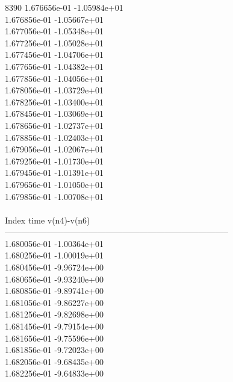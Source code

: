 8390	1.676656e-01	-1.05984e+01	\\ 	1.676856e-01	-1.05667e+01	\\ 	1.677056e-01	-1.05348e+01	\\ 	1.677256e-01	-1.05028e+01	\\ 	1.677456e-01	-1.04706e+01	\\ 	1.677656e-01	-1.04382e+01	\\ 	1.677856e-01	-1.04056e+01	\\ 	1.678056e-01	-1.03729e+01	\\ 	1.678256e-01	-1.03400e+01	\\ 	1.678456e-01	-1.03069e+01	\\ 	1.678656e-01	-1.02737e+01	\\ 	1.678856e-01	-1.02403e+01	\\ 	1.679056e-01	-1.02067e+01	\\ 	1.679256e-01	-1.01730e+01	\\ 	1.679456e-01	-1.01391e+01	\\ 	1.679656e-01	-1.01050e+01	\\ 	1.679856e-01	-1.00708e+01	\\ \hline
\\ \hline
Index   time            v(n4)-v(n6)     \\ \hline
--------------------------------------------------------------------------------\\ 	1.680056e-01	-1.00364e+01	\\ 	1.680256e-01	-1.00019e+01	\\ 	1.680456e-01	-9.96724e+00	\\ 	1.680656e-01	-9.93240e+00	\\ 	1.680856e-01	-9.89741e+00	\\ 	1.681056e-01	-9.86227e+00	\\ 	1.681256e-01	-9.82698e+00	\\ 	1.681456e-01	-9.79154e+00	\\ 	1.681656e-01	-9.75596e+00	\\ 	1.681856e-01	-9.72023e+00	\\ 	1.682056e-01	-9.68435e+00	\\ 	1.682256e-01	-9.64833e+00	\\ \hline
